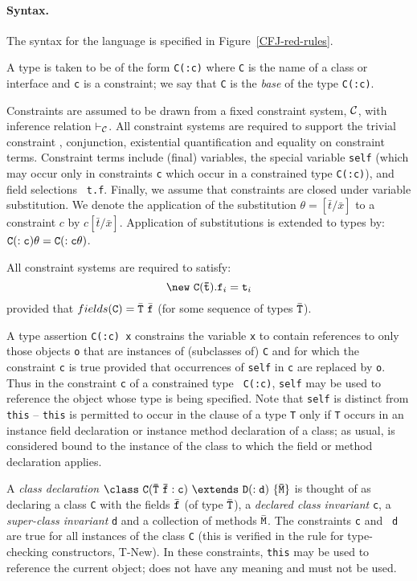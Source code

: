 \begin{figure*}
\caption{Reduction rules for Constrained FJ}\label{CFJ-red-rules}
\end{figure*}

\paragraph{Syntax.}
The syntax for the language is specified in Figure~\ref{CFJ-red-rules}.

A type is taken to be of the form {\tt C(:c)} where {\tt C} is the
name of a class or interface and {\tt c} is a constraint; we say that
{\tt C} is the {\em base} of the type {\tt C(:c)}.

Constraints are assumed to be drawn from a fixed constraint system,
$\cal C$, with inference relation $\vdash_{\cal C}$. All constraint
systems are required to support the trivial constraint \true,
conjunction, existential quantification and equality on constraint
terms. Constraint terms include (final) variables, the special
variable {\tt self} (which may occur only in constraints {\tt c} which
occur in a constrained type {\tt C(:c)}), and field selections {\tt
t.f}. Finally, we assume that constraints are closed under variable
substitution. We denote the application of the substitution
$\theta=[\bar{t}/\bar{x}]$ to a constraint $c$ by
$c[\bar{t}/\bar{x}]$. Application of substitutions is extended to
types by: ${\tt C(:c)\theta}={\tt C(:c\theta)}$.

All constraint systems are required to satisfy:
$$\new\ {\tt C(\bar{\tt t})}.{\tt f}_i={\tt t}_i  $$
provided that $fields({\tt C})=\bar{\tt T}\ \bar{\tt f}$ (for some 
sequence of types $\bar{\tt T}$).

A type assertion {\tt C(:c) x} constrains the variable {\tt x} to
contain references to only those objects {\tt o} that are instances of
(subclasses of) {\tt C} and for which the constraint {\tt c} is true
provided that occurrences of {\tt self} in {\tt c} are replaced by
{\tt o}. Thus in the constraint {\tt c} of a constrained type {\tt
C(:c)}, {\tt self} may be used to reference the object whose type is
being specified. Note that {\tt self} is distinct from {\tt this} --
{\tt this} is permitted to occur in the clause of a type {\tt T} only
if {\tt T} occurs in an instance field declaration or instance method
declaration of a class; as usual, \this{} is considered bound to the
instance of the class to which the field or method declaration
applies.

A {\em class declaration} $\tt\class \ C(\bar{T}\ \bar{f}:c)\ \extends\ D(:d)\
\{\bar{M}\}$ is thought of as declaring a class {\tt C} with the
fields $\bar{\tt f}$ (of type $\bar{\tt T}$), a {\em declared class
invariant} {\tt c}, a {\em super-class invariant} {\tt d} and a
collection of methods $\bar{\tt M}$. The constraints {\tt c} and {\tt
d} are true for all instances of the class {\tt C} (this is verified
in the rule for type-checking constructors, T-New).  In these
constraints, {\tt this} may be used to reference the current object;
\self{} does not have any meaning and must not be used.

